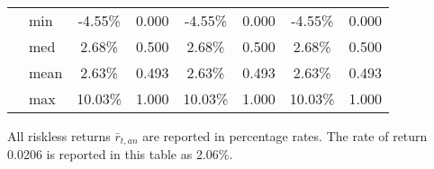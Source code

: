 \documentclass[letterpaper,12pt]{article}
\theoremstyle{definition}
\begin{document}
\begin{spacing}{1.5}
\begin{table}[htbp]
\begin{threeparttable}
\begin{tabular}{>{\small}c >{\small}l| >{\small}c >{\small}c| >{\small}c >{\small}c| >{\small}c >{\small}c}
      & min & -4.55\% & 0.000 & -4.55\% & 0.000 & -4.55\% & 0.000 \\
      & med & 2.68\% & 0.500 & 2.68\% & 0.500 & 2.68\% & 0.500 \\
      & mean & 2.63\% & 0.493 & 2.63\% & 0.493 & 2.63\% & 0.493 \\
      & max & 10.03\% & 1.000 & 10.03\% & 1.000 & 10.03\% & 1.000 \\
      \hline\hline
    \end{tabular}
    \begin{tablenotes}
      \scriptsize{\item[]All riskless returns $\bar{r}_{t,an}$ are reported in percentage rates. The rate of return 0.0206 is reported in this table as 2.06\%.}
    \end{tablenotes}
    \end{threeparttable}
  \end{table}


\end{spacing}
\end{document}
